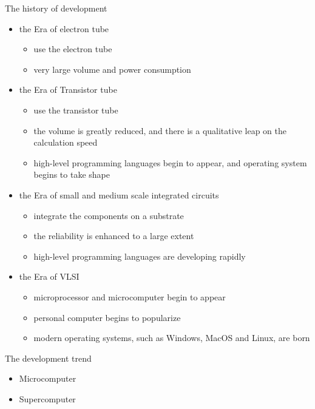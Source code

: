\begin{flushleft}
        The history of development

        \begin{itemize}
            \item the Era of electron tube
		    \begin{itemize}
			\item use the electron tube
			\item very large volume and power consumption
        	    \end{itemize}
    	    \item the Era of Transistor tube
                    \begin{itemize}
		        \item use the transistor tube
		        \item the volume is greatly reduced, and there is a qualitative leap on the calculation speed
		        \item high-level programming languages begin to appear, and operating system begins to take shape
                    \end{itemize}
            \item the Era of small and  medium scale integrated circuits
        	    \begin{itemize}
		        \item integrate the components on a substrate
		        \item the reliability is enhanced to a large extent
		        \item high-level programming languages are developing rapidly 
	            \end{itemize}
            \item the Era of VLSI
                    \begin{itemize}
		        \item microprocessor and microcomputer begin to appear
		        \item personal computer begins to popularize
		        \item modern operating systems, such as Windows, MacOS and Linux, are born
                    \end{itemize}
        \end{itemize}

	The development trend

        \begin{itemize}
		\item Microcomputer
		\item Supercomputer
        \end{itemize}
\end{flushleft}

